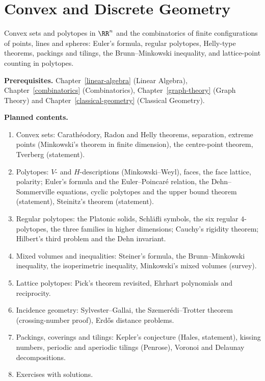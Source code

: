 \chapter{Convex and Discrete Geometry}\label{discrete-geometry}

Convex sets and polytopes in $\RR^n$ and the combinatorics of finite configurations of points, lines and spheres: Euler's formula, regular polytopes, Helly-type theorems, packings and tilings, the
Brunn--Minkowski inequality, and lattice-point counting in polytopes.

\noindent\textbf{Prerequisites.} Chapter~\ref{linear-algebra} (Linear Algebra), Chapter~\ref{combinatorics} (Combinatorics), Chapter~\ref{graph-theory} (Graph Theory) and Chapter~\ref{classical-geometry}
(Classical Geometry).

\noindent\textbf{Planned contents.}
\begin{enumerate}
\item Convex sets: Carathéodory, Radon and Helly theorems, separation, extreme points (Minkowski's theorem in finite dimension), the centre-point theorem, Tverberg (statement).
\item Polytopes: $V$- and $H$-descriptions (Minkowski--Weyl), faces, the face lattice, polarity; Euler's formula and the Euler--Poincaré relation, the Dehn--Sommerville equations, cyclic polytopes and the
upper bound theorem (statement), Steinitz's theorem (statement).
\item Regular polytopes: the Platonic solids, Schläfli symbols, the six regular $4$-polytopes, the three families in higher dimensions; Cauchy's rigidity theorem; Hilbert's third problem and the Dehn
invariant.
\item Mixed volumes and inequalities: Steiner's formula, the Brunn--Minkowski inequality, the isoperimetric inequality, Minkowski's mixed volumes (survey).
\item Lattice polytopes: Pick's theorem revisited, Ehrhart polynomials and reciprocity.
\item Incidence geometry: Sylvester--Gallai, the Szemerédi--Trotter theorem (crossing-number proof), Erdős distance problems.
\item Packings, coverings and tilings: Kepler's conjecture (Hales, statement), kissing numbers, periodic and aperiodic tilings (Penrose), Voronoi and Delaunay decompositions.
\item Exercises with solutions.
\end{enumerate}
